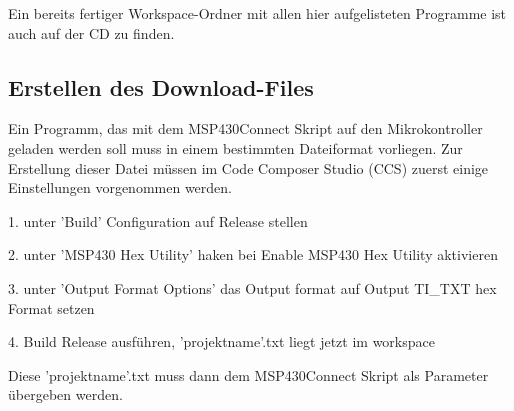 Ein bereits fertiger Workspace-Ordner mit allen hier aufgelisteten Programme ist auch auf der CD zu finden.


\subsection{Erstellen des Download-Files}
Ein Programm, das mit dem MSP430Connect Skript auf den Mikrokontroller geladen werden soll muss in einem bestimmten Dateiformat vorliegen. Zur Erstellung dieser Datei müssen im Code Composer Studio (CCS) zuerst einige Einstellungen vorgenommen werden.

1. unter 'Build' Configuration auf Release stellen

2. unter 'MSP430 Hex Utility' haken bei Enable MSP430 Hex Utility aktivieren

3. unter 'Output Format Options' das Output format auf Output TI\_TXT hex Format setzen

4. Build Release ausführen, 'projektname'.txt liegt jetzt im workspace

Diese 'projektname'.txt muss dann dem MSP430Connect Skript als Parameter übergeben werden.